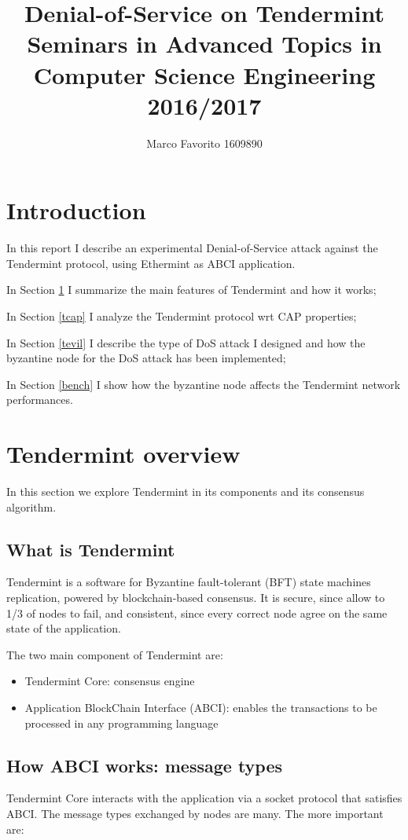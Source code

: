 \documentclass[]{article}
\author{Marco Favorito 1609890}
\title{%
Denial-of-Service on Tendermint \\ 
\large Seminars in Advanced Topics in Computer Science Engineering 2016/2017}
\begin{document}
\maketitle
\tableofcontents

\section*{Introduction}
In this report I describe an experimental Denial-of-Service attack against the Tendermint protocol, using Ethermint as ABCI application.

In Section \ref{toverview} I summarize the main features of Tendermint and how it works;

In Section \ref{tcap} I analyze the Tendermint protocol wrt CAP properties;

In Section \ref{tevil} I describe the type of DoS attack I designed and how the byzantine node for the DoS attack has been implemented;

In Section \ref{bench} I show how the byzantine node affects the Tendermint network performances.

\section{Tendermint overview}
\label{toverview}

In this section we explore Tendermint in its components and its consensus algorithm.
\subsection{What is Tendermint}

Tendermint \cite{tpaper, tthesis, tdocs} is a software for Byzantine fault-tolerant (BFT) state machines replication, powered by blockchain-based consensus. It is secure, since allow to 1/3 of nodes to fail, and consistent, since every correct node agree on the same state of the application.

The two main component of Tendermint are:
\begin{itemize}
	\item Tendermint Core: consensus engine
	\item Application BlockChain Interface (ABCI): enables the transactions to be processed in any programming language

\end{itemize}

\subsection{How ABCI works: message types}
Tendermint Core interacts with the application via a socket protocol that satisfies ABCI.
The message types exchanged by nodes are many. The more important are:
\end{document}
